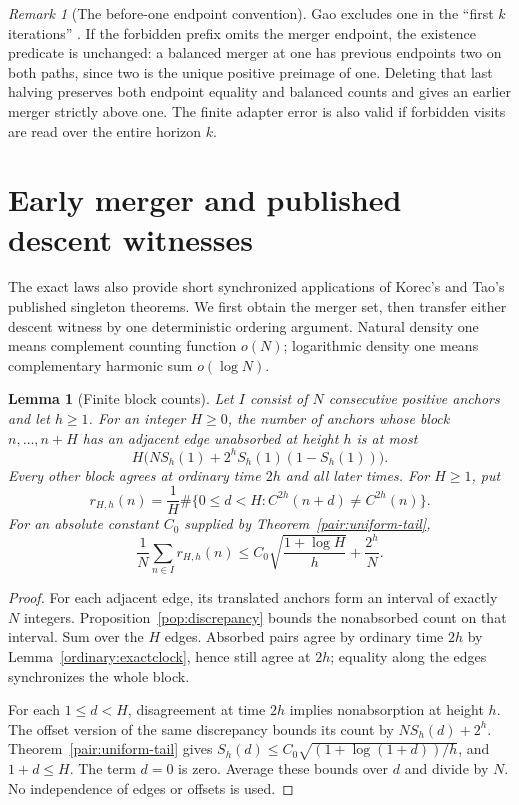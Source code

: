 \documentclass[11pt]{amsart}
\newtheorem{lemma}[theorem]{Lemma}
\theoremstyle{definition}
\theoremstyle{remark}
\newtheorem{remark}[theorem]{Remark}
\begin{document}
\begin{remark}[The before-one endpoint convention]
Gao excludes one in the ``first $k$ iterations'' \cite[p.~264]{Gao1993}.
If the forbidden prefix omits the merger endpoint, the existence predicate
is unchanged: a balanced merger at one has previous endpoints two on both
paths, since two is the unique positive preimage of one. Deleting that
last halving preserves both endpoint equality and balanced counts and
gives an earlier merger strictly above one. The finite adapter error is
also valid if forbidden visits are read over the entire horizon $k$.
\end{remark}

\section{Early merger and published descent witnesses}\label{sec:windows}

The exact laws also provide short synchronized applications of Korec's
and Tao's published singleton theorems. We first obtain the merger set,
then transfer either descent witness by one deterministic ordering argument.
Natural density one means complement counting function $o(N)$;
logarithmic density one means complementary harmonic sum $o(\log N)$.

\begin{lemma}[Finite block counts]\label{pop:blockcounts}\label{lem:window-count}
Let $I$ consist of $N$ consecutive positive anchors and let $h\ge1$.
For an integer $H\ge0$, the number of anchors whose block
$n,\ldots,n+H$ has an adjacent edge unabsorbed at height $h$ is at most
\[
 H\bigl(NS_h(1)+2^hS_h(1)(1-S_h(1))\bigr).
\]
Every other block agrees at ordinary time $2h$ and all later times.
For $H\ge1$, put
\[
 r_{H,h}(n)=\frac1H\#\{0\le d<H:C^{2h}(n+d)\ne C^{2h}(n)\}.
\]
For an absolute constant $C_0$ supplied by Theorem~\ref{pair:uniform-tail},
\[
 \frac1N\sum_{n\in I}r_{H,h}(n)
 \le C_0\sqrt{\frac{1+\log H}{h}}+\frac{2^h}{N}.
\]
\end{lemma}
\begin{proof}
For each adjacent edge, its translated anchors form an interval of exactly
$N$ integers. Proposition~\ref{pop:discrepancy} bounds the nonabsorbed
count on that interval. Sum over the $H$ edges. Absorbed pairs agree by
ordinary time $2h$ by Lemma~\ref{ordinary:exactclock}, hence still agree
at $2h$; equality along the edges synchronizes the whole block.

For each $1\le d<H$, disagreement at time $2h$ implies nonabsorption
at height $h$. The offset version of the same discrepancy bounds its
count by $NS_h(d)+2^h$. Theorem~\ref{pair:uniform-tail} gives
$S_h(d)\le C_0\sqrt{(1+\log(1+d))/h}$, and $1+d\le H$.
The term $d=0$ is zero. Average these bounds over $d$ and divide by $N$.
No independence of edges or offsets is used.
\end{proof}
\end{document}
